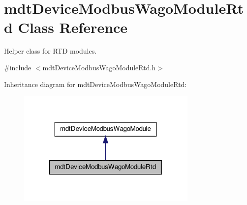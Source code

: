 \hypertarget{classmdt_device_modbus_wago_module_rtd}{
\section{mdtDeviceModbusWagoModuleRtd Class Reference}
\label{classmdt_device_modbus_wago_module_rtd}
}


Helper class for RTD modules.  




{\ttfamily \#include $<$mdtDeviceModbusWagoModuleRtd.h$>$}



Inheritance diagram for mdtDeviceModbusWagoModuleRtd:
\nopagebreak
\begin{figure}[H]
\begin{center}
\leavevmode
\includegraphics[width=250pt]{classmdt_device_modbus_wago_module_rtd__inherit__graph}
\end{center}
\end{figure}


